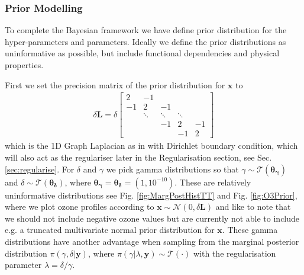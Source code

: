 \subsubsection{Prior Modelling}
To complete the Bayesian framework we have define prior distribution for the hyper-parameters and parameters.
Ideally we define the prior distributions as uninformative as possible, but include functional dependencies and physical properties.

First we set the precision matrix of the prior distribution for $\bm{x}$ to
\begin{align}
	\delta \bm{L} =
	\delta
	\begin{bmatrix}
		2 & -1 & & &  \\
		-1 & 2 & -1 & &   \\
		& \ddots & \ddots & \ddots &\\ 
		& & -1 & 2 & -1  \\
		& & & -1 & 2 
	\end{bmatrix} 
	\label{eq:GLapl} 
\end{align}
which is the 1D Graph Laplacian as in \cite{wang2015graphs,fox2016fast} with Dirichlet boundary condition, which will also act as the regulariser later in the Regularisation section, see Sec. \ref{sec:regularise}.
For $\delta$ and $\gamma$  we pick gamma distributions so that $\gamma \sim \mathcal{T}(\bm{\theta_{\gamma}}) $ and $\delta \sim \mathcal{T}(\bm{\theta_{\delta}})$, where $\bm{\theta_{\gamma}} = \bm{\theta_{\delta}} = (1,10^{-10})$.
These are relatively uninformative distributions see Fig. \ref{fig:MargPostHistTT} and Fig. \ref{fig:O3Prior}, where we plot ozone profiles according to $\bm{x}\sim \mathcal{N}(0, \delta \bm{L})$ and like to note that we should not include negative ozone values but are currently not able to include e.g. a truncated multivariate normal prior distribution for $\bm{x}$. 
These gamma distributions have another advantage when sampling from the marginal posterior distribution $\pi(\gamma,\delta | \bm{y})$, where $\pi(\gamma | \lambda , \bm{y}) \sim \mathcal{T}(\cdot)$ with the regularisation parameter $\lambda = \delta / \gamma $.


